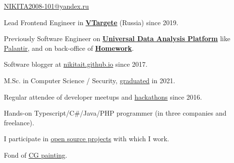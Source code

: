\documentclass{yb}
\begin{document}
\ybPrintPhoto{}

{\scshape\bfseries\Large {}}\newline
\href{mailto:NIKITA2008-101@yandex.ru}{NIKITA2008-101@yandex.ru}

\vspace*{1em}

Lead Frontend Engineer in \href{https://vtargete.ru/}{\textbf{VTargete}} (Russia) \newline
since 2019.

\vspace*{1em}

Previously Software Engineer on \textbf{\href{https://baltinfocom.ru/BigData\#en}{Universal Data Analysis Platform}} like \href{https://www.palantir.com/}{Palantir}, and on back-office of \textbf{\href{https://homework.ru}{Homework}}.

Software blogger at \href{https://nikitait.github.io/}{nikitait.github.io} since 2017.

M.Sc. in Computer Science / Security, \href{https://etu.ru/en/university/}{graduated} in 2021.

Regular attendee of developer meetups and \href{https://www.youtube.com/watch?v=gVKDU043EWI&t=1s&ab_channel=EPAMSaint-Petersburg}{hackathons} since 2016.

Hands-on Typescript/C\#/Java/PHP programmer (in three companies and freelance).

I participate in \href{https://github.com/nikitait}{open source projects} with which I work.

Fond of \href{https://www.artstation.com/nikitait}{CG painting}.
\end{document}
